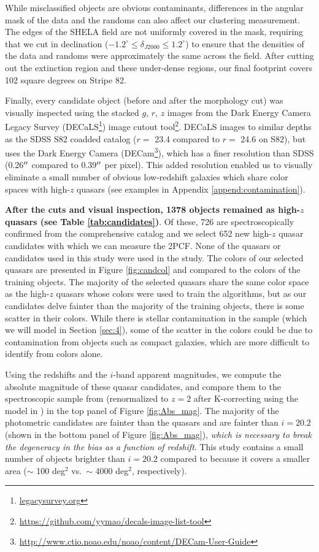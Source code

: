 \documentclass[apj, numberedappendix]{emulateapj}
\begin{document}
While misclassified objects are obvious contaminants, differences in the angular mask of the data and the randoms can also affect our clustering measurement. The edges of the SHELA field are not uniformly covered in the mask, requiring that we cut in declination ($-1.2^{\circ} \leq \delta_{J2000} \leq 1.2^{\circ}$) to ensure that the densities of the data and randoms were approximately the same across the field. After cutting out the extinction region and these under-dense regions, our final footprint covers 102 square degrees on Stripe 82.

Finally, every candidate object (before and after the morphology cut) was visually inspected using the stacked $g$, $r$, $z$ images from the Dark Energy Camera Legacy Survey (DECaLS\footnote{\url{legacysurvey.org}}) image cutout tool\footnote{\url{https://github.com/yymao/decals-image-list-tool}}. DECaLS images to similar depths as the SDSS S82 coadded catalog ($r=$ 23.4 compared to $r=$ 24.6 on S82), but uses the Dark Energy Camera (DECam\footnote{\url{http://www.ctio.noao.edu/noao/content/DECam-User-Guide}}), which has a finer resolution than SDSS (0.26$\mbox{$^{\prime\prime}$}$ compared to 0.39$\mbox{$^{\prime\prime}$}$ per pixel). This added resolution enabled us to visually eliminate a small number of obvious low-redshift galaxies which share color spaces with high-$z$ quasars (see examples in Appendix \ref{append:contamination}). 

{\bf{After the cuts and visual inspection, 1378 objects remained as high-$z$ quasars (see Table \ref{tab:candidates})}}. Of these, 726 are spectroscopically confirmed from the \citet{Richards2015} comprehensive catalog and we select 652 new high-$z$ quasar candidates with which we can measure the 2PCF. None of the quasars or candidates used in this study were used in the \citet{Shen2007} study. The colors of our selected quasars are presented in Figure \ref{fig:candcol} and compared to the colors of the training objects. The majority of the selected quasars share the same color space as the high-$z$ quasars whose colors were used to train the algorithms, but as our candidates delve fainter than the majority of the training objects, there is some scatter in their colors. While there is stellar contamination in the sample (which we will model in Section \ref{sec:4}), some of the scatter in the colors could be due to contamination from objects such as compact galaxies, which are more difficult to identify from colors alone. 

Using the redshifts and the $i$-band apparent magnitudes, we compute the absolute magnitude of these quasar candidates, and compare them to the spectroscopic sample from \citet{Shen2007} (renormalized to $z=2$ after K-correcting using the model in \citealt{Richards2006}) in the top panel of Figure \ref{fig:Abs_mag}. The majority of the photometric candidates are fainter than the \citet{Shen2007} quasars and are fainter than $i=20.2$ (shown in the bottom panel of Figure \ref{fig:Abs_mag}), {\it{which is necessary to break the degeneracy in the bias as a function of redshift}}. This study contains a small number of objects brighter than $i=20.2$ compared to \citet{Shen2007} because it covers a smaller area ($\sim$ 100 deg$^2$ vs.\ $\sim$ 4000 deg$^2$, respectively).
 
\end{document}
